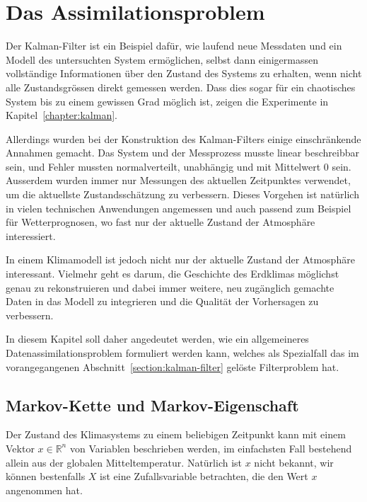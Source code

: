 %
%
%
\section{Das Assimilationsproblem\label{section:assimilationsproblem}}
Der Kalman-Filter ist ein Beispiel dafür, wie laufend neue Messdaten und
ein Modell des untersuchten System ermöglichen, selbst dann einigermassen
vollständige Informationen über den Zustand des Systems zu erhalten, wenn
nicht alle Zustandsgrössen direkt gemessen werden.
Dass dies sogar für ein chaotisches System bis zu einem gewissen Grad
möglich ist, zeigen die Experimente in Kapitel~\ref{chapter:kalman}.

Allerdings wurden bei der Konstruktion des Kalman-Filters einige
einschränkende Annahmen gemacht.
Das System und der Messprozess musste linear beschreibbar sein, 
und Fehler mussten normalverteilt, unabhängig und mit Mittelwert $0$ sein.
Ausserdem wurden immer nur Messungen des aktuellen Zeitpunktes verwendet,
um die aktuellste Zustandsschätzung zu verbessern.
Dieses Vorgehen ist natürlich in vielen technischen Anwendungen angemessen
und auch passend zum Beispiel für Wetterprognosen, wo fast nur der aktuelle
Zustand der Atmosphäre interessiert.

In einem Klimamodell ist jedoch nicht nur der aktuelle Zustand der Atmosphäre
interessant.
Vielmehr geht es darum, die Geschichte des Erdklimas möglichst genau
zu rekonstruieren und dabei immer weitere, neu zugänglich gemachte 
Daten in das Modell zu integrieren und die Qualität der Vorhersagen zu
verbessern.

In diesem Kapitel soll daher angedeutet werden, wie ein allgemeineres
Datenassimilationsproblem formuliert werden kann, welches als Spezialfall
das im vorangegangenen Abschnitt~\ref{section:kalman-filter} gelöste
Filterproblem hat.

\subsection{Markov-Kette und Markov-Eigenschaft\label{subsection:markov}}
Der Zustand des Klimasystems zu einem beliebigen Zeitpunkt kann mit einem
Vektor $x\in\mathbb R^n$ von Variablen beschrieben werden, im einfachsten
Fall bestehend allein aus der globalen Mitteltemperatur.
Natürlich ist $x$ nicht bekannt, wir können bestenfalls $X$ ist eine
Zufallsvariable betrachten, die den Wert $x$ angenommen hat.

